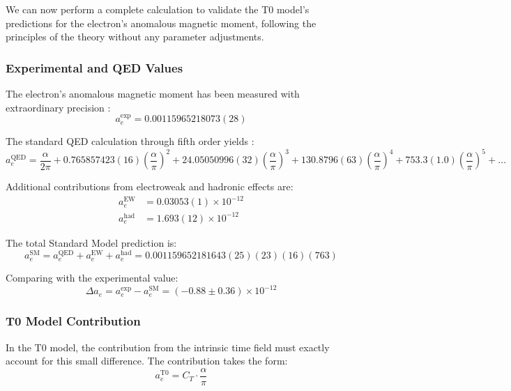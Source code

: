 \documentclass[12pt,a4paper]{article}
\begin{document}
	We can now perform a complete calculation to validate the T0 model's predictions for the electron's anomalous magnetic moment, following the principles of the theory without any parameter adjustments.
	
	\subsubsection{Experimental and QED Values}
	
	The electron's anomalous magnetic moment has been measured with extraordinary precision \cite{Hanneke2008}:
	\begin{equation}
		a_e^{\text{exp}} = 0.00115965218073(28)
	\end{equation}
	
	The standard QED calculation through fifth order yields \cite{Aoyama2019}:
	\begin{equation}
		a_e^{\text{QED}} = \frac{\alpha}{2\pi} + 0.765857423(16) \left(\frac{\alpha}{\pi}\right)^2 + 24.05050996(32) \left(\frac{\alpha}{\pi}\right)^3 + 130.8796(63) \left(\frac{\alpha}{\pi}\right)^4 + 753.3(1.0) \left(\frac{\alpha}{\pi}\right)^5 + \ldots
	\end{equation}
	
	Additional contributions from electroweak and hadronic effects are:
	\begin{align}
		a_e^{\text{EW}} &= 0.03053(1) \times 10^{-12} \\
		a_e^{\text{had}} &= 1.693(12) \times 10^{-12}
	\end{align}
	
	The total Standard Model prediction is:
	\begin{equation}
		a_e^{\text{SM}} = a_e^{\text{QED}} + a_e^{\text{EW}} + a_e^{\text{had}} = 0.001159652181643(25)(23)(16)(763)
	\end{equation}
	
	Comparing with the experimental value:
	\begin{equation}
		\Delta a_e = a_e^{\text{exp}} - a_e^{\text{SM}} = (-0.88 \pm 0.36) \times 10^{-12}
	\end{equation}
	
	\subsubsection{T0 Model Contribution}
	
	In the T0 model, the contribution from the intrinsic time field must exactly account for this small difference. The contribution takes the form:
	\begin{equation}
		a_e^{\text{T0}} = C_T \cdot \frac{\alpha}{\pi}
	\end{equation}
	
\end{document}
